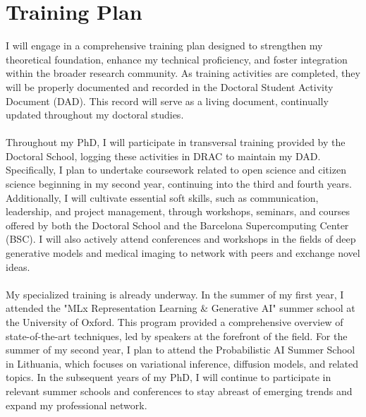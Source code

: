 \chapter{Training Plan}\label{ch:TrainingPlan}

I will engage in a comprehensive training plan designed to strengthen my theoretical foundation, enhance my technical proficiency, and foster integration within the broader research community. As training activities are completed, they will be properly documented and recorded in the Doctoral Student Activity Document (DAD). This record will serve as a living document, continually updated throughout my doctoral studies. \\
\\
Throughout my PhD, I will participate in transversal training provided by the Doctoral School, logging these activities in DRAC to maintain my DAD. Specifically, I plan to undertake coursework related to open science and citizen science beginning in my second year, continuing into the third and fourth years. Additionally, I will cultivate essential soft skills, such as communication, leadership, and project management, through workshops, seminars, and courses offered by both the Doctoral School and the Barcelona Supercomputing Center (BSC). I will also actively attend conferences and workshops in the fields of deep generative models and medical imaging to network with peers and exchange novel ideas. \\
\\
My specialized training is already underway. In the summer of my first year, I attended the "MLx Representation Learning \& Generative AI" summer school at the University of Oxford. This program provided a comprehensive overview of state-of-the-art techniques, led by speakers at the forefront of the field. For the summer of my second year, I plan to attend the Probabilistic AI Summer School in Lithuania, which focuses on variational inference, diffusion models, and related topics. In the subsequent years of my PhD, I will continue to participate in relevant summer schools and conferences to stay abreast of emerging trends and expand my professional network.


